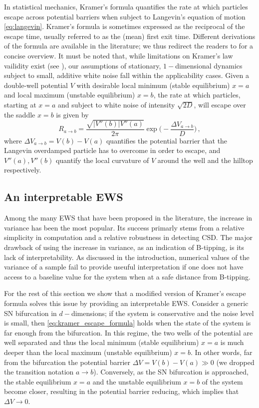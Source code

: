 \documentclass[a4paper,fleqn]{cas-sc}
\begin{document}
%
In statistical mechanics, Kramer's formula quantifies the rate at which particles escape across potential barriers when subject to Langevin's equation of motion \eqref{eq:langevin}.
Kramer's formula is sometimes expressed as the reciprocal of the escape time, usually referred to as the (mean) first exit time.
Different derivations of the formula are available in the literature; we thus redirect the readers to \cite{Berglund2013} for a concise overview.
It must be noted that, while limitations on Kramer's law vailidity exist (see \cite{Berglund2013}), our assumptions of stationary, $1-$dimensional dynamics subject to small, additive white noise fall within the applicability cases.
Given a double-well potential $V$ with desirable local minimum (stable equilibrium) $x=a$ and local maximum (unstable equilibrium) $x=b$, the rate at which particles, starting at $x=a$ and subject to white noise of intensity $\sqrt{2D}$, will escape over the saddle $x=b$ is given by
%
\begin{equation}\label{eq:kramer_escape_formula}
        R_{a\to b} = \frac{\sqrt{|V''(b)|V''(a)}}{2\pi}\exp\bigg(-\frac{\Delta V_{a\to b}}{D}\bigg)\,,
\end{equation}
%
where $\Delta V_{a\to b} = V(b) - V(a)$ quantifies the potential barrier that the Langevin overdamped particle has to overcome in order to escape, and $V''(a),V''(b)$ quantify the local curvature of $V$ around the well and the hilltop respectively.
%
\subsection{An interpretable EWS}\label{subsec:modified_escape_ews}
Among the many EWS that have been proposed in the literature, the increase in variance has been the most popular.
Its success primarly stems from a relative simplicity in computation and a relative robustness in detecting CSD.
The major drawback of using the increase in variance, as an indication of B-tipping, is its lack of interpretability.
As discussed in the introduction, numerical values of the variance of a sample fail to provide useuful interpretation if one does not have access to a baseline value for the system when at a safe distance from B-tipping.

For the rest of this section we show that a modified version of Kramer's escape formula solves this issue by providing an interpretable EWS.
Consider a generic SN bifurcation in $d-$dimensions; if the system is conservative and the noise level is small, then \eqref{eq:kramer_escape_formula} holds when the state of the system is far enough from the bifurcation.
In this regime, the two wells of the potential are well separated and thus the local minimum (stable equilibrium) $x=a$ is much deeper than the local maximum (unstable equilibrium) $x=b$.
In other words, far from the bifurcation the potential barrier $\Delta V = V(b) - V(a) \gg 0$ (we dropped the transition notation $a\to b$).
Conversely, as the SN bifurcation is approached, the stable equilibrium $x=a$ and the unstable equilibrium $x=b$ of the system become closer, resulting in the potential barrier reducing, which implies that $\Delta V\to0$.
\end{document}
